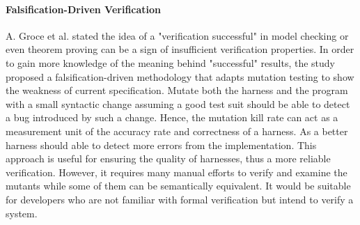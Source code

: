 \paragraph{Falsification-Driven Verification} A. Groce et al. \cite{7372062} stated the idea of a "verification successful" in model checking or even theorem proving can be a sign of insufficient verification properties. In order to gain more knowledge of the meaning behind "successful" results, the study proposed a falsification-driven methodology that adapts mutation testing to show the weakness of current specification. Mutate both the harness and the program with a small syntactic change assuming a good test suit should be able to detect a bug introduced by such a change. Hence, the mutation kill rate can act as a measurement unit of the accuracy rate and correctness of a harness. As a better harness should able to detect more errors from the implementation. This approach is useful for ensuring the quality of harnesses, thus a more reliable verification. However, it requires many manual efforts to verify and examine the mutants while some of them can be semantically equivalent. It would be suitable for developers who are not familiar with formal verification but intend to verify a system.






